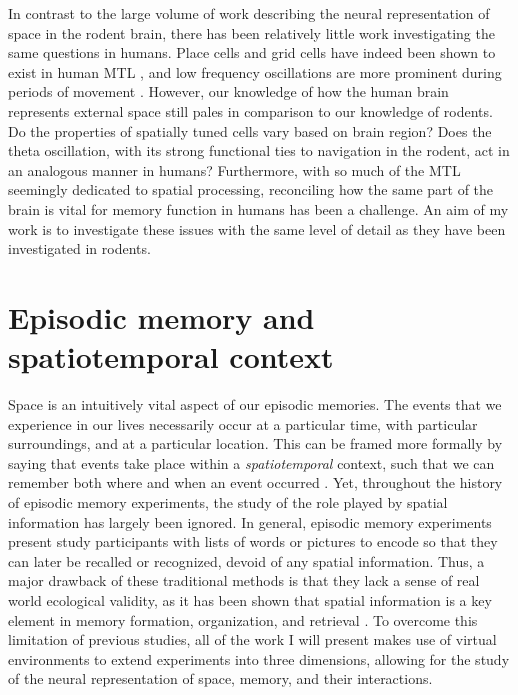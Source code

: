 In contrast to the large volume of work describing the neural representation of space in the rodent brain, there has been relatively little work investigating the same questions in humans. Place cells and grid cells have indeed been shown to exist in human MTL \citep{EkstEtal03,JacoEtal10,JacoEtal13}, and low frequency oscillations are more prominent during periods of movement \cite{CaplEtal03,KahaEtal99}. However, our knowledge of how the human brain represents external space still pales in comparison to our knowledge of rodents. Do the properties of spatially tuned cells vary based on brain region? Does the theta oscillation, with its strong functional ties to navigation in the rodent, act in an analogous manner in humans? Furthermore, with so much of the MTL seemingly dedicated to spatial processing, reconciling how the same part of the brain is vital for memory function in humans has been a challenge. An aim of my work is to investigate these issues with the same level of detail as they have been investigated in rodents.





\section{Episodic memory and spatiotemporal context}

Space is an intuitively vital aspect of our episodic memories. The events that we experience in our lives necessarily occur at a particular time, with particular surroundings, and at a particular location. This can be framed more formally by saying that events take place within a \textit{spatiotemporal} context, such that we can remember both where and when an event occurred \citep{Eich04}. Yet, throughout the history of episodic memory experiments, the study of the role played by spatial information has largely been ignored. In general, episodic memory experiments present study participants with lists of words or pictures to encode so that they can later be recalled or recognized, devoid of any spatial information. Thus, a major drawback of these traditional methods is that they lack a sense of real world ecological validity, as it has been shown that spatial information is a key element in memory formation, organization, and retrieval \citep{MillEtal12a}. To overcome this limitation of previous studies, all of the work I will present makes use of virtual environments to extend experiments into three dimensions, allowing for the study of the neural representation of space, memory, and their interactions.

